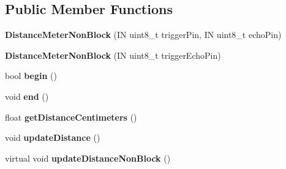 \subsection*{Public Member Functions}
\begin{DoxyCompactItemize}
\item 
\mbox{\label{class_easyuino_1_1_distance_meter_non_block_ad7e7b63fc4655957eb00f24d82512d2a}} 
{\bfseries Distance\+Meter\+Non\+Block} (IN uint8\+\_\+t trigger\+Pin, IN uint8\+\_\+t echo\+Pin)
\item 
\mbox{\label{class_easyuino_1_1_distance_meter_non_block_af77c0f4649ea521a5b75c457b6762db2}} 
{\bfseries Distance\+Meter\+Non\+Block} (IN uint8\+\_\+t trigger\+Echo\+Pin)
\item 
\mbox{\label{class_easyuino_1_1_distance_meter_non_block_a46d2093d0fc125e98c3602868c088a77}} 
bool {\bfseries begin} ()
\item 
\mbox{\label{class_easyuino_1_1_distance_meter_non_block_a845d4db657ff408205d1cdb3c35982a4}} 
void {\bfseries end} ()
\item 
\mbox{\label{class_easyuino_1_1_distance_meter_non_block_a00419fc2c2ff7c587735063971aa7464}} 
float {\bfseries get\+Distance\+Centimeters} ()
\item 
\mbox{\label{class_easyuino_1_1_distance_meter_non_block_a4ea37c6c0562a76cd03636db329743f9}} 
void {\bfseries update\+Distance} ()
\item 
\mbox{\label{class_easyuino_1_1_distance_meter_non_block_a5cfeac9309d045a5eba22d8955e376b6}} 
virtual void {\bfseries update\+Distance\+Non\+Block} ()
\end{DoxyCompactItemize}
